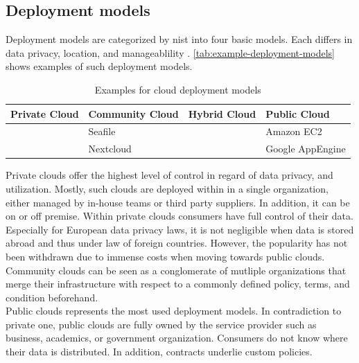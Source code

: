 \subsection{Deployment models}
\label{subsec:cloud-deployment}

Deployment models are categorized by \ac{nist} into four basic models. Each differs in data privacy, location, and manageablility \cite{Mell2011}. \autoref{tab:example-deployment-models} shows examples of such deployment models.

\begin{table}[h]
    \centering
    \caption{Examples for cloud deployment models}
    \begin{tabular}{l|l|l|l}
        Private Cloud & Community Cloud & Hybrid Cloud & Public Cloud     \\ \hline
                      & Seafile         &              & Amazon EC2       \\
                      & Nextcloud       &              & Google AppEngine \\
    \end{tabular}
    \label{tab:example-deployment-models}
\end{table}

Private clouds offer the highest level of control in regard of data privacy, and utilization. Mostly, such clouds are deployed within in a single organization, either managed by in-house teams or third party suppliers. In addition, it can be on or off premise. Within private clouds consumers have full control of their data. Especially for European data privacy laws, it is not negligible when data is stored abroad and thus under law of foreign countries. However, the popularity has not been withdrawn due to immense costs when moving towards public clouds. \cite{Dillon2010, Mell2011}\\

Community clouds can be seen as a conglomerate of mutliple organizations that merge their infrastructure with respect to a commonly defined policy, terms, and condition beforehand. \cite{Mell2011}\\

Public clouds represents the most used deployment models. In contradiction to private one, public clouds are fully owned by the service provider such as business, academics, or government organization. Consumers do not know where their data is distributed. In addition, contracts underlie custom policies. \cite{Mell2011}\\

